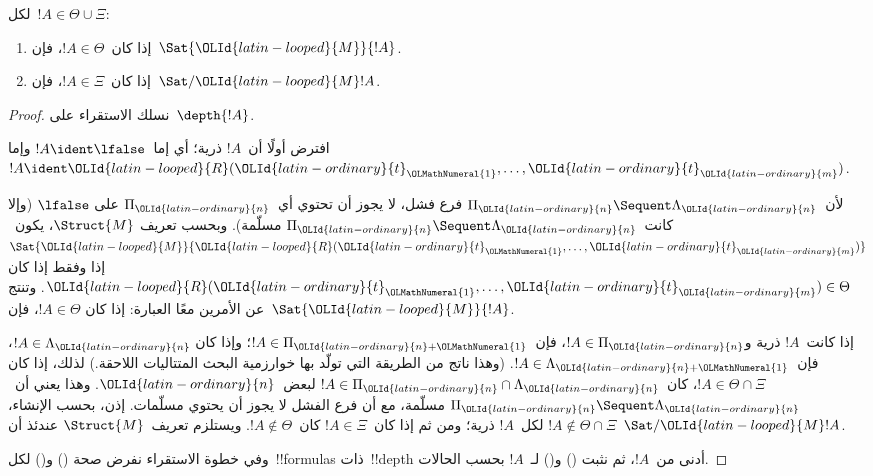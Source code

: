 \documentclass[../../../include/open-logic-section]{subfiles}
\begin{document}
\begin{lem}
لكل~$!A\in\Theta\cup\Xi$:
\begin{enumerate}
  \item إذا كان~$!A\in\Theta$، فإن~$\Sat{\OLId{latin-looped}{M}}{!A}$.
  \item إذا كان~$!A\in\Xi$، فإن~$\Sat/{\OLId{latin-looped}{M}}{!A}$.
\end{enumerate}
\end{lem}

\begin{proof}
  نسلك الاستقراء على~$\depth{!A}$.

افترض أولًا أن~$!A$ ذرية؛ أي إما~$!A\ident\lfalse$ وإما
$!A\ident \OLId{latin-looped}{R}(\OLId{latin-ordinary}{t}_\OLMathNumeral{1},\dots,\OLId{latin-ordinary}{t}_\OLId{latin-ordinary}{m})$.

لأن~$\Pi_\OLId{latin-ordinary}{n} \Sequent \Lambda_\OLId{latin-ordinary}{n}$ فرع فشل، لا يجوز أن تحتوي أي~$\Pi_\OLId{latin-ordinary}{n}$ على
$\lfalse$ (وإلا كانت~$\Pi_\OLId{latin-ordinary}{n} \Sequent \Lambda_\OLId{latin-ordinary}{n}$ مسلّمة). وبحسب تعريف
$\Struct{M}$، يكون~$\Sat{\OLId{latin-looped}{M}}{\OLId{latin-looped}{R}(\OLId{latin-ordinary}{t}_\OLMathNumeral{1},\dots,\OLId{latin-ordinary}{t}_\OLId{latin-ordinary}{m})}$ إذا وفقط إذا كان
$\OLId{latin-looped}{R}(\OLId{latin-ordinary}{t}_\OLMathNumeral{1},\dots,\OLId{latin-ordinary}{t}_\OLId{latin-ordinary}{m})\in\Theta$. وتنتج عن الأمرين معًا العبارة: إذا كان
$!A\in\Theta$، فإن~$\Sat{\OLId{latin-looped}{M}}{!A}$.

إذا كانت~$!A$ ذرية و$!A\in\Pi_\OLId{latin-ordinary}{n}$، فإن~$!A\in\Pi_{\OLId{latin-ordinary}{n}+\OLMathNumeral{1}}$؛ وإذا كان
$!A\in\Lambda_\OLId{latin-ordinary}{n}$، فإن~$!A\in\Lambda_{\OLId{latin-ordinary}{n}+\OLMathNumeral{1}}$. (وهذا ناتج من الطريقة التي
تولّد بها خوارزمية البحث المتتاليات اللاحقة.) لذلك، إذا كان
$!A\in\Theta\cap\Xi$، كان~$!A\in\Pi_\OLId{latin-ordinary}{n}\cap\Lambda_\OLId{latin-ordinary}{n}$ لبعض~$\OLId{latin-ordinary}{n}$. وهذا يعني
أن~$\Pi_\OLId{latin-ordinary}{n} \Sequent \Lambda_\OLId{latin-ordinary}{n}$ مسلّمة، مع أن فرع الفشل لا يجوز أن يحتوي
مسلّمات. إذن، بحسب الإنشاء، $!A\notin\Theta\cap\Xi$ لكل~$!A$ ذرية؛ ومن ثم
إذا كان~$!A\in\Xi$ كان~$!A\notin\Theta$. ويستلزم تعريف~$\Struct{M}$ عندئذ
أن~$\Sat/{\OLId{latin-looped}{M}}{!A}$.

وفي خطوة الاستقراء نفرض صحة () و() لكل~!!{formula}s ذات~!!{depth}
أدنى من~$!A$، ثم نثبت () و() لـ~$!A$ بحسب الحالات.


\end{proof}
\end{document}
